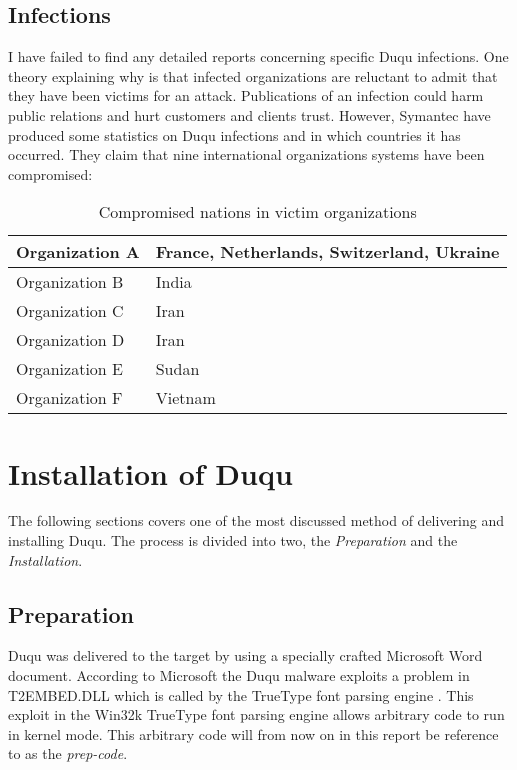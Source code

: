 \documentclass[11pt,english,a4paper]{report}
\begin{document}
\section{Infections}
I have failed to find any detailed reports concerning specific Duqu infections. One theory explaining why is that infected organizations are reluctant to admit that they have been victims for an attack. Publications of an infection could harm public relations and hurt customers and clients trust. However, Symantec have produced some statistics on Duqu infections and in which countries it has occurred. They claim that nine international organizations systems have been compromised:
\begin{table}[h]
        \caption{Compromised nations in victim organizations \cite{DUQU_SYMANTEC}}
        \label{my-label}
        \begin{tabular}{|l|l|}
        \hline
        Organization A & France, Netherlands, Switzerland, Ukraine  \\ \hline
        Organization B & India  \\ \hline
        Organization C & Iran  \\ \hline
        Organization D & Iran  \\ \hline
        Organization E & Sudan  \\ \hline
        Organization F & Vietnam  \\ \hline
        \end{tabular}
      \end{table}

\chapter{Installation of Duqu}
The following sections covers one of the most discussed method of delivering and installing Duqu. The process is divided into two, the \textit{Preparation} and the \textit{Installation}.

\section{Preparation}
Duqu was delivered to the target by using a specially crafted Microsoft Word document. According to Microsoft the Duqu malware exploits a problem in T2EMBED.DLL which is called by the TrueType font parsing engine \cite{RYAN_ZDNET}. This exploit in the Win32k TrueType font parsing engine allows arbitrary code to run in kernel mode. This arbitrary code will from now on in this report be reference to as the \textit{prep-code}. 
\end{document}
